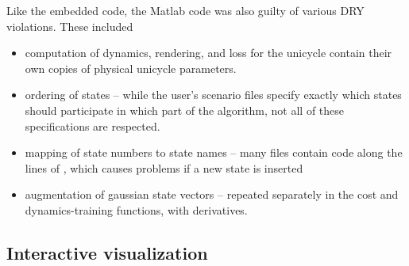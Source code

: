 \documentclass[main.tex]{subfiles}
\begin{document}
	Like the embedded code, the Matlab code was also guilty of various DRY violations.
	These included
	\begin{itemize}[noitemsep]
		\item computation of dynamics, rendering, and loss for the unicycle contain their own copies of physical unicycle parameters.
		\item ordering of states -- while the user's scenario files specify exactly which states should participate in which part of the algorithm, not all of these specifications are respected.
		\item mapping of state numbers to state names -- many files contain code along the lines of , which causes problems if a new state is inserted
		\item augmentation of gaussian state vectors -- repeated separately in the cost and dynamics-training functions, with derivatives.
	\end{itemize}

\subsection{Interactive visualization}
\end{document}
